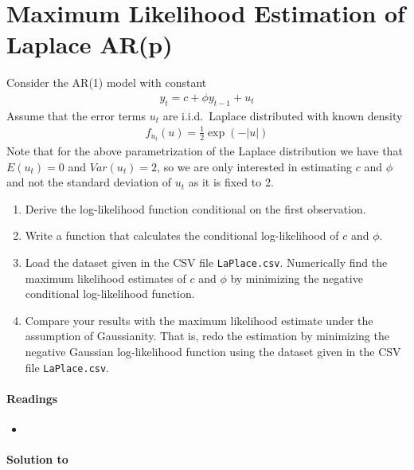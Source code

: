 \section[Maximum Likelihood Estimation of Laplace AR{(p)}]{Maximum Likelihood Estimation of Laplace AR{(p)}\label{ex:MaximumLikelihoodEstimationLaPlaceARp}}
Consider the AR{(1)} model with constant
\begin{align*}
y_t = c + \phi y_{t-1} + u_t
\end{align*}
Assume that the error terms \(u_t\) are {i.i.d.}\ Laplace distributed with known density
\begin{align*}
f_{u_{t}}(u) = \frac{1}{2} \exp{\left( -|u|\right)}
\end{align*}
Note that for the above parametrization of the Laplace distribution
  we have that \(E(u_t)=0\) and \(Var(u_t)=2\),
  so we are only interested in estimating \(c\) and \(\phi \)
  and not the standard deviation of \(u_t\) as it is fixed to 2.
\begin{enumerate}
\item
Derive the log-likelihood function conditional on the first observation.
\item
Write a function that calculates the conditional log-likelihood of \(c\) and \(\phi \).
\item
Load the dataset given in the CSV file \texttt{LaPlace.csv}.
Numerically find the maximum likelihood estimates of \(c\) and \(\phi \)
  by minimizing the negative conditional log-likelihood function.
\item
Compare your results with the maximum likelihood estimate under the assumption of Gaussianity.
That is, redo the estimation by minimizing the negative Gaussian log-likelihood function
  using the dataset given in the CSV file \texttt{LaPlace.csv}.
\end{enumerate}

\paragraph{Readings}
\begin{itemize}
\item \textcite{Lutkepohl_2004_UnivariateTimeSeries}
\end{itemize}


\begin{solution}\textbf{Solution to }
\ifDisplaySolutions%

\fi
\newpage
\end{solution}